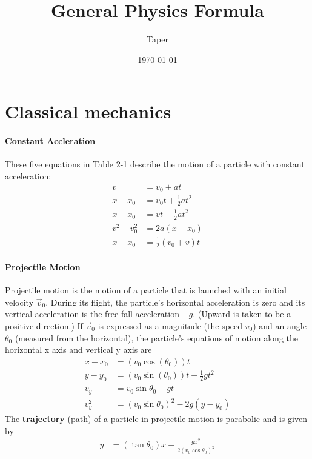 \documentclass{article}
\title{General Physics Formula}
\date{\today}
\author{Taper}
\numberwithin{equation}{subsection} %
\theoremstyle{definition}
\begin{document}
\maketitle
{}
\tableofcontents

\section{Classical mechanics}
\label{sec:Classical-mechanics}

\paragraph{Constant Accleration}
These five equations in Table 2-1 describe the motion of a particle with constant acceleration:
\begin{align}
    v           &= v_0 + at \\
    x-x_0       &= v_0 t + \frac{1}{2} at^2\\
    x-x_0       &= vt - \frac{1}{2} at^2\\
    v^2 - v_0^2 &= 2a(x-x_0)\\
    x-x_0       &= \frac{1}{2} (v_0+v) t
\end{align}

\paragraph{Projectile Motion} Projectile motion is the motion of a
particle that is launched with an initial velocity $\vec v_0$. During
its flight, the particle’s horizontal acceleration is zero and its
vertical acceleration is the free-fall acceleration $-g$. (Upward is
taken to be a positive direction.) If $\vec v_0$ is expressed as a
magnitude (the speed $v_0$) and an angle $\theta_0$ (measured from the
horizontal), the particle’s equations of motion along the horizontal x
axis and vertical y axis are
\begin{align}
    x-x_0 &= (v_0 \cos(\theta_0) ) t \\
    y-y_0 &= (v_0 \sin(\theta_0) ) t - \frac{1}{2} gt^2 \\
    v_y   &= v_0 \sin{\theta_0} - gt \\
    v_y^2 &= (v_0 \sin{\theta_0})^2 - 2g (y-y_0)
\end{align}
The \textbf{trajectory} (path) of a particle in projectile motion is
parabolic and is given by
\begin{align}
    y &= (\tan{\theta_0}) x - \frac{gx^2}{2(v_0 \cos{\theta_0})^2} 
\end{align}
\end{document}
